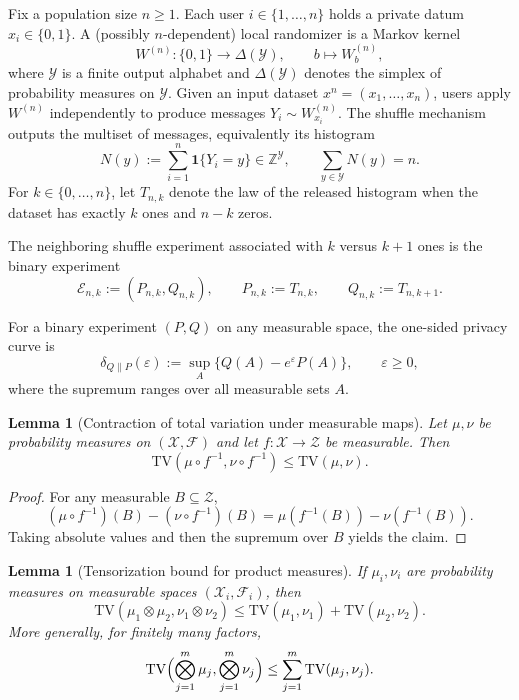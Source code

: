 \documentclass{article}
\newtheorem{lemma}[theorem]{Lemma}
\newcommand{\TV}{\mathrm{TV}}
\newcommand{\1}{\mathbf 1}
\begin{document}
Fix a population size $n\ge 1$. Each user $i\in\{1,\dots,n\}$ holds a private datum $x_i\in\{0,1\}$. A
(possibly $n$-dependent) local randomizer is a Markov kernel
\[
W^{(n)}:\{0,1\}\to \Delta(\mathcal Y),\qquad b\mapsto W_b^{(n)},
\]
where $\mathcal Y$ is a finite output alphabet and $\Delta(\mathcal Y)$ denotes the simplex of probability
measures on $\mathcal Y$. Given an input dataset $x^n=(x_1,\dots,x_n)$, users apply $W^{(n)}$ independently to
produce messages $Y_i\sim W^{(n)}_{x_i}$. The shuffle mechanism outputs the multiset of messages, equivalently
its histogram
\[
N(y):=\sum_{i=1}^n \1\{Y_i=y\}\in \mathbb Z^{\mathcal Y},\qquad \sum_{y\in\mathcal Y}N(y)=n.
\]
For $k\in\{0,\dots,n\}$, let $T_{n,k}$ denote the law of the released histogram when the dataset has exactly $k$
ones and $n-k$ zeros.

The neighboring shuffle experiment associated with $k$ versus $k+1$ ones is the binary experiment
\[
\mathcal E_{n,k}:=(P_{n,k},Q_{n,k}),\qquad P_{n,k}:=T_{n,k},\qquad Q_{n,k}:=T_{n,k+1}.
\]

For a binary experiment $(P,Q)$ on any measurable space, the one-sided privacy curve is
\[
\delta_{Q\|P}(\varepsilon)
:=
\sup_A\bigl\{Q(A)-e^\varepsilon P(A)\bigr\},
\qquad \varepsilon\ge 0,
\]
where the supremum ranges over all measurable sets $A$.

\begin{lemma}[Contraction of total variation under measurable maps]
\label{lem:tv-contraction-main}
Let $\mu,\nu$ be probability measures on $(\mathcal X,\mathcal F)$ and let $f:\mathcal X\to\mathcal Z$ be measurable.
Then
\[
\TV(\mu\circ f^{-1},\nu\circ f^{-1})\le \TV(\mu,\nu).
\]
\end{lemma}

\begin{proof}
For any measurable $B\subseteq\mathcal Z$,
\[
(\mu\circ f^{-1})(B)-(\nu\circ f^{-1})(B)=\mu(f^{-1}(B))-\nu(f^{-1}(B)).
\]
Taking absolute values and then the supremum over $B$ yields the claim.
\end{proof}

\begin{lemma}[Tensorization bound for product measures]
\label{lem:tv-tensorization-main}
If $\mu_i,\nu_i$ are probability measures on measurable spaces $(\mathcal X_i,\mathcal F_i)$, then
\[
\TV(\mu_1\otimes\mu_2,\nu_1\otimes\nu_2)
\le
\TV(\mu_1,\nu_1)+\TV(\mu_2,\nu_2).
\]
More generally, for finitely many factors,
\[
\TV\Bigl(\bigotimes_{j=1}^m \mu_j,\bigotimes_{j=1}^m \nu_j\Bigr)
\le \sum_{j=1}^m \TV(\mu_j,\nu_j).
\]
\end{lemma}
\end{document}
